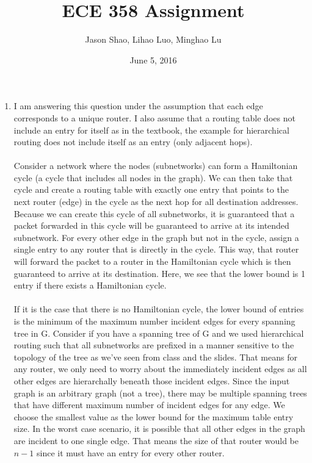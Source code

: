 \documentclass[12pt]{article}
\title{ECE 358 Assignment }
\author{Jason Shao, Lihao Luo, Minghao Lu}
\date{June 5, 2016}
\begin{document}
\maketitle
\renewcommand{\thesubsection}{Problem \arabic{subsection}}


\def\question#1{\item[\bf #1.]}
\def\part#1{\item[\bf #1)]}
\newcommand{\pc}[1]{\mbox{\textbf{#1}}} %

\begin{enumerate}
    \item I am answering this question under the assumption that each edge corresponds to a unique router. I also assume that a routing table does not include an entry for itself as in the textbook, the example for hierarchical routing does not include itself as an entry (only adjacent hops). \\ \\Consider a network where the nodes (subnetworks) can form a Hamiltonian cycle (a cycle that includes all nodes in the graph). We can then take that cycle and create a routing table with exactly one entry that points to the next router (edge) in the cycle as the next hop for all destination addresses. Because we can create this cycle of all subnetworks, it is guaranteed that a packet forwarded in this cycle will be guaranteed to arrive at its intended subnetwork. For every other edge in the graph but not in the cycle, assign a single entry to any router that is directly in the cycle. This way, that router will forward the packet to a router in the Hamiltonian cycle which is then guaranteed to arrive at its destination. Here, we see that the lower bound is 1 entry if there exists a Hamiltonian cycle. \\ \\If it is the case that there is no Hamiltonian cycle, the lower bound of entries is the minimum of the maximum number incident edges for every spanning tree in G. Consider if you have a spanning tree of G and we used hierarchical routing such that all subnetworks are prefixed in a manner sensitive to the topology of the tree as we've seen from class and the slides. That means for any router, we only need to worry about the immediately incident edges as all other edges are hierarchally beneath those incident edges. Since the input graph is an arbitrary graph (not a tree), there may be multiple spanning trees that have different maximum number of incident edges for any edge. We choose the smallest value as the lower bound for the maximum table entry size. In the worst case scenario, it is possible that all other edges in the graph are incident to one single edge. That means the size of that router would be $n-1$ since it must have an entry for every other router.
    

\end{enumerate}
\end{document}
